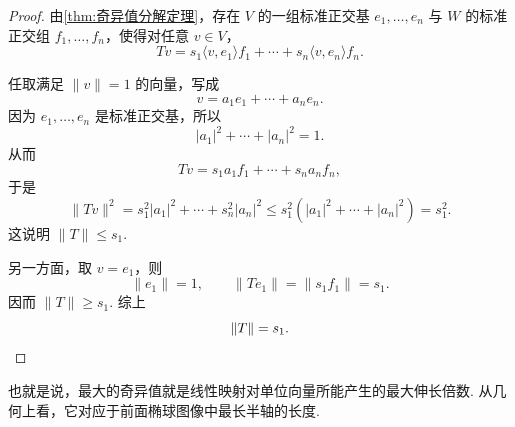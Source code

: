 \begin{proof}
    由\autoref{thm:奇异值分解定理}，存在 $V$ 的一组标准正交基 $e_1, \ldots, e_n$ 与 $W$ 的标准正交组 $f_1, \ldots, f_n$，使得对任意 $v \in V$，
    \[
        Tv = s_1 \langle v, e_1 \rangle f_1 + \cdots + s_n \langle v, e_n \rangle f_n.
    \]

    任取满足 $\lVert v \rVert = 1$ 的向量，写成
    \[
        v = a_1e_1 + \cdots + a_ne_n.
    \]
    因为 $e_1, \ldots, e_n$ 是标准正交基，所以
    \[
        |a_1|^2 + \cdots + |a_n|^2 = 1.
    \]
    从而
    \[
        Tv = s_1a_1f_1 + \cdots + s_na_nf_n,
    \]
    于是
    \[
        \lVert Tv \rVert^2 = s_1^2|a_1|^2 + \cdots + s_n^2|a_n|^2 \leqslant s_1^2(|a_1|^2 + \cdots + |a_n|^2) = s_1^2.
    \]
    这说明 $\lVert T \rVert \leqslant s_1$.

    另一方面，取 $v = e_1$，则
    \[
        \lVert e_1 \rVert = 1,\qquad \lVert Te_1 \rVert = \lVert s_1f_1 \rVert = s_1.
    \]
    因而 $\lVert T \rVert \geqslant s_1$. 综上
    \[
        \lVert T \rVert = s_1. \qedhere
    \]
\end{proof}

也就是说，最大的奇异值就是线性映射对单位向量所能产生的最大伸长倍数. 从几何上看，它对应于前面椭球图像中最长半轴的长度.

\begin{summary}

\end{summary}

